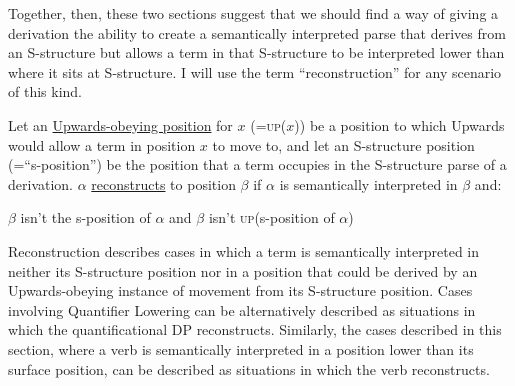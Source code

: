 Together, then, these two sections suggest that we should find a way of giving a derivation the ability to create a semantically interpreted parse that derives from an S-structure but allows a term in that S-structure to be interpreted lower than where it sits at S-structure. I will use the term ``reconstruction'' for any scenario of this kind.
	\begin{exe}
	\raggedright
		\ex \label{ex6:reconstrdef} Let an \underline{Upwards-obeying position} for $x$ (=\textsc{up}($x$)) be a position to which Upwards would allow a term in position $x$ to move to, and let an S-structure position (=``s-position'') be the position that a term occupies in the S-structure parse of a derivation. $\alpha$ \underline{reconstructs} to position $\beta$ if $\alpha$ is semantically interpreted in $\beta$ and:
		\begin{xlist}
			\ex $\beta$ isn't the s-position of $\alpha$ and
			\ex $\beta$ isn't \textsc{up}(s-position of $\alpha$)
		\end{xlist}
	\end{exe}
Reconstruction describes cases in which a term is semantically interpreted in neither its S-structure position nor in a position that could be derived by an Upwards-obeying instance of movement from its S-structure position. Cases involving Quantifier Lowering can be alternatively described as situations in which the quantificational DP reconstructs. Similarly, the cases described in this section, where a verb is semantically interpreted in a position lower than its surface position, can be described as situations in which the verb reconstructs.

